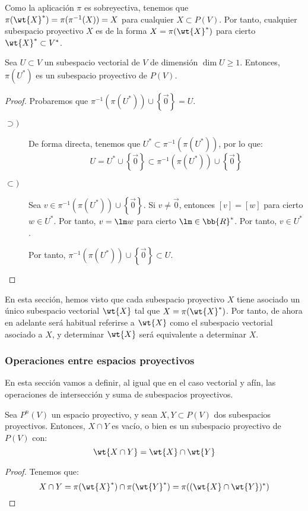 Como la aplicación $\pi$ es sobreyectiva, tenemos que $\pi(\wt{X}^\ast)=\pi(\pi^{-1}(X))=X$ para cualquier $X\subset P(V)$.
Por tanto, cualquier subespacio proyectivo $X$ es de la forma $X=\pi(\wt{X}^\ast)$ para cierto $\wt{X}^\ast\subset V^\ast$. 
\begin{prop}
    Sea $U\subset V$ un subespacio vectorial de $V$ de dimensión $\dim U \geq 1$. Entonces, $\pi(U^\ast)$ es un subespacio proyectivo de $P(V)$.
\end{prop}
\begin{proof}
    Probaremos que $\pi^{-1}(\pi(U^\ast))\cup \left\{\vec{0}\right\}=U$.
    \begin{description}
        \item[$\supset)$] De forma directa, tenemos que $U^\ast \subset \pi^{-1}(\pi(U^\ast))$, por lo que:
        \begin{equation*}
            U = U^\ast \cup \left\{\vec{0}\right\} \subset \pi^{-1}(\pi(U^\ast))\cup \left\{\vec{0}\right\}
        \end{equation*}

        \item[$\subset)$] Sea $v\in \pi^{-1}(\pi(U^\ast))\cup \left\{\vec{0}\right\}$.
        Si $v\neq \vec{0}$, entonces $[v]=[w]$ para cierto $w\in U^\ast$. Por tanto, $v=\lm w$ para cierto $\lm \in \bb{R}^\ast$. Por tanto, $v\in U^\ast$.

        Por tanto, $\pi^{-1}(\pi(U^\ast))\cup \left\{\vec{0}\right\} \subset U$.
    \end{description}
\end{proof}
\begin{observacion}
    En esta sección, hemos visto que cada subespacio proyectivo $X$ tiene asociado un único
    subespacio vectorial $\wt{X}$ tal que $X=\pi(\wt{X}^\ast)$. Por tanto,
    de ahora en adelante será habitual referirse a $\wt{X}$ como el subespacio vectorial asociado a $X$, y
    determinar $\wt{X}$ será equivalente a determinar $X$.
\end{observacion}

\subsubsection{Operaciones entre espacios proyectivos}

En esta sección vamos a definir, al igual que en el caso vectorial y afín, las operaciones de intersección y suma de subespacios proyectivos.
\begin{prop}[Intersección]
    Sea $P^n(V)$ un espacio proyectivo, y sean $X,Y\subset P(V)$ dos subespacios proyectivos. Entonces, $X\cap Y$ es vacío, o bien es un subespacio proyectivo de $P(V)$ con:
    \begin{equation*}
        \wt{X\cap Y} = \wt{X} \cap \wt{Y}
    \end{equation*}
\end{prop}
\begin{proof}
    Tenemos que:
    \begin{equation*}
        X\cap Y = \pi(\wt{X}^\ast) \cap \pi(\wt{Y}^\ast) = \pi((\wt{X}\cap \wt{Y})^\ast)
    \end{equation*}
\end{proof}

